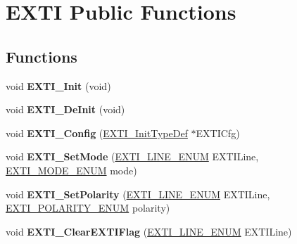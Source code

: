 \hypertarget{group___e_x_t_i___public___functions}{\section{\-E\-X\-T\-I \-Public \-Functions}
\label{group___e_x_t_i___public___functions}
}
\subsection*{\-Functions}
\begin{DoxyCompactItemize}
\item 
\hypertarget{group___e_x_t_i___public___functions_ga87164602355c937e2d8a0347661f7f20}{void {\bfseries \-E\-X\-T\-I\-\_\-\-Init} (void)}\label{group___e_x_t_i___public___functions_ga87164602355c937e2d8a0347661f7f20}

\item 
\hypertarget{group___e_x_t_i___public___functions_ga07072e339cb9ecb9cd9d4b94afc9f317}{void {\bfseries \-E\-X\-T\-I\-\_\-\-De\-Init} (void)}\label{group___e_x_t_i___public___functions_ga07072e339cb9ecb9cd9d4b94afc9f317}

\item 
\hypertarget{group___e_x_t_i___public___functions_ga1300fc4d8b607c700491355374dcbcbe}{void {\bfseries \-E\-X\-T\-I\-\_\-\-Config} (\hyperlink{struct_e_x_t_i___init_type_def}{\-E\-X\-T\-I\-\_\-\-Init\-Type\-Def} $\ast$\-E\-X\-T\-I\-Cfg)}\label{group___e_x_t_i___public___functions_ga1300fc4d8b607c700491355374dcbcbe}

\item 
\hypertarget{group___e_x_t_i___public___functions_ga1a1e331de79bc47e2a68ac280bb218d3}{void {\bfseries \-E\-X\-T\-I\-\_\-\-Set\-Mode} (\hyperlink{group___e_x_t_i___public___types_ga801d7b6336865f9903b69623a89c1a69}{\-E\-X\-T\-I\-\_\-\-L\-I\-N\-E\-\_\-\-E\-N\-U\-M} \-E\-X\-T\-I\-Line, \hyperlink{group___e_x_t_i___public___types_ga97c789b0a35f1410c0a501ea23c54216}{\-E\-X\-T\-I\-\_\-\-M\-O\-D\-E\-\_\-\-E\-N\-U\-M} mode)}\label{group___e_x_t_i___public___functions_ga1a1e331de79bc47e2a68ac280bb218d3}

\item 
\hypertarget{group___e_x_t_i___public___functions_gad8fd7651a73df3255b6403fc1d849ae4}{void {\bfseries \-E\-X\-T\-I\-\_\-\-Set\-Polarity} (\hyperlink{group___e_x_t_i___public___types_ga801d7b6336865f9903b69623a89c1a69}{\-E\-X\-T\-I\-\_\-\-L\-I\-N\-E\-\_\-\-E\-N\-U\-M} \-E\-X\-T\-I\-Line, \hyperlink{group___e_x_t_i___public___types_ga1b5e79307a79d0b2bc548041d4dd7dcd}{\-E\-X\-T\-I\-\_\-\-P\-O\-L\-A\-R\-I\-T\-Y\-\_\-\-E\-N\-U\-M} polarity)}\label{group___e_x_t_i___public___functions_gad8fd7651a73df3255b6403fc1d849ae4}

\item 
\hypertarget{group___e_x_t_i___public___functions_ga9b6d5588f203b877307af1039c00f0cc}{void {\bfseries \-E\-X\-T\-I\-\_\-\-Clear\-E\-X\-T\-I\-Flag} (\hyperlink{group___e_x_t_i___public___types_ga801d7b6336865f9903b69623a89c1a69}{\-E\-X\-T\-I\-\_\-\-L\-I\-N\-E\-\_\-\-E\-N\-U\-M} \-E\-X\-T\-I\-Line)}\label{group___e_x_t_i___public___functions_ga9b6d5588f203b877307af1039c00f0cc}

\end{DoxyCompactItemize}
